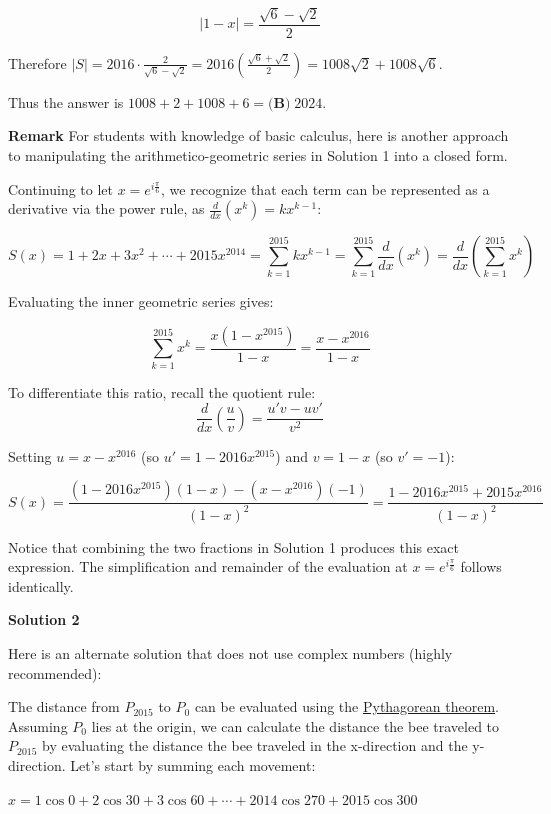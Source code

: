 \begin{enumerate}
 \[|1-x|=\frac{\sqrt{6}-\sqrt{2}}{2}\]

 Therefore $|S|=2016\cdot\frac{2}{\sqrt{6}-\sqrt{2}}=2016\left(\frac{\sqrt{6}+\sqrt{2}}{2}\right)=1008\sqrt{2}+1008 \sqrt{6}$.

 Thus the answer is $1008+2+1008+6=\boxed{\textbf{(B)}\; 2024}$.

 \textbf{Remark} For students with knowledge of basic calculus, here is another approach to manipulating the arithmetico-geometric series in Solution 1 into a closed form. 

 Continuing to let $x=e^{i\frac{\pi}{6}}$, we recognize that each term can be represented as a derivative via the power rule, as $\frac{d}{dx}(x^{k})=kx^{k-1}$:

 
 \[S(x)=1 + 2x + 3x^{2} + \cdots + 2015x^{2014} = \sum_{k=1}^{2015}kx^{k-1} = \sum_{k=1}^{2015}\frac{d}{dx}(x^k) = \frac{d}{dx}\left(\sum_{k=1}^{2015}x^{k}\right)\]

 Evaluating the inner geometric series gives:

 
 \[\sum_{k=1}^{2015}x^{k}=\frac{x(1-x^{2015})}{1-x}=\frac{x-x^{2016}}{1-x}\]

 To differentiate this ratio, recall the quotient rule:
 \[\frac{d}{dx}\left(\frac{u}{v}\right)=\frac{u'v-uv'}{v^2}\]

 Setting $u=x-x^{2016}$ (so $u'=1-2016x^{2015}$) and $v=1-x$ (so $v'=-1$):

 
 \[S(x)=\frac{(1-2016x^{2015})(1-x)-(x-x^{2016})(-1)}{(1-x)^{2}}=\frac{1-2016x^{2015}+2015x^{2016}}{(1-x)^{2}}\]

 Notice that combining the two fractions in Solution 1 produces this exact expression. The simplification and remainder of the evaluation at $x=e^{i\frac{\pi}{6}}$ follows identically.

 



\textbf{Solution 2}

Here is an alternate solution that does not use complex numbers (highly recommended):

 The distance from $P_{2015}$ to $P_0$ can be evaluated using the \href{https://artofproblemsolving.com/wiki/index.php?title=Pythagorean\_theorem}{Pythagorean theorem}. Assuming $P_0$ lies at the origin, we can calculate the distance the bee traveled to $P_{2015}$ by evaluating the distance the bee traveled in the x-direction and the y-direction. Let's start by summing each movement:

 $x=1\cos{0}+2\cos{30}+3\cos{60}+\cdots+2014\cos{270}+2015\cos{300}$


\end{enumerate}
